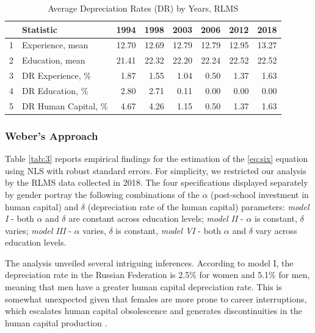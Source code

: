 \documentclass[12pt,a4paper]{article}
\numberwithin{equation}{section}
\begin{document}
\begin{table}[h!]
	\centering
	\caption{Average Depreciation Rates (DR) by Years, RLMS}
	\label{tab:2}
	\begin{tabular}{rlrrrrrr}
		\hline
		& \textbf{Statistic} & \textbf{1994} & \textbf{1998} & \textbf{2003} & \textbf{2006} & \textbf{2012} & \textbf{2018} \\ 
		\hline
		1 & Experience, mean & 12.70 & 12.69 & 12.79 & 12.79 & 12.95 & 13.27 \\ 
		2 & Education, mean & 21.41 & 22.32 & 22.20 & 22.24 & 22.52 & 22.52 \\ 
		\midrule
		3 & DR Experience, \% & 1.87 & 1.55 & 1.04 & 0.50 & 1.37 & 1.63 \\ 
		4 & DR Education, \% & 2.80 & 2.71 & 0.11 & 0.00 & 0.00 & 0.00 \\ 
		5 & DR Human Capital, \% & 4.67 & 4.26 & 1.15 & 0.50 & 1.37 & 1.63 \\ 
		\hline
	\end{tabular}
\end{table}
	
\subsubsection{Weber's Approach}

Table \ref{tab:3} reports empirical findings for the estimation of the \ref{eq:six} equation using NLS with robust standard errors. For simplicity, we restricted our analysis by the RLMS data collected in 2018. The four specifications displayed separately by gender portray the following combinations of the $\alpha$ (post-school investment in human capital) and $\delta$ (depreciation rate of the human capital) parameters: \textit{model I} - both $\alpha$ and $\delta$ are constant across education levels; \textit{model II} - $\alpha$ is constant, $\delta$ varies; \textit{model III} - $\alpha$ varies, $\delta$ is constant, \textit{model VI} - both $\alpha$ and $\delta$ vary across education levels.

The analysis unveiled several intriguing inferences. According to model I, the depreciation rate in the Russian Federation is 2.5\% for women and 5.1\% for men, meaning that men have a greater human capital depreciation rate. This is somewhat unexpected given that females are more prone to career interruptions, which escalates human capital obsolescence and generates discontinuities in the human capital production \parencite{weber_173._2008}.
\end{document}
